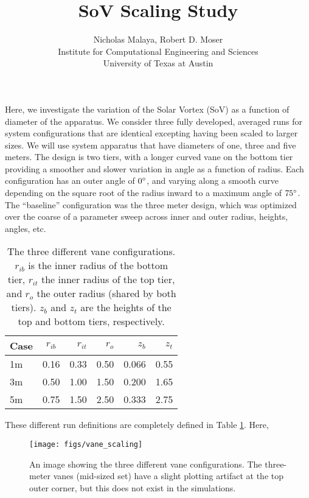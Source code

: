 \documentclass[english]{article}
\title{\bf{SoV Scaling Study}}
\author{Nicholas Malaya, Robert D. Moser \\ Institute for Computational Engineering and Sciences \\ University of Texas at Austin} \date{}
\begin{document}
\maketitle

Here, we investigate the variation of the Solar Vortex (SoV) as a function of diameter of the apparatus. We consider 
three fully developed, averaged runs for system configurations that are identical excepting having been scaled to larger sizes. We will use 
system apparatus that have diameters of one, three and five meters. The design is two tiers, with a longer curved vane on the bottom tier providing a 
smoother and slower variation in angle as a function of radius. Each configuration has an outer angle of $0\degree$, and varying along a smooth curve 
depending on the square root of the radius inward to a maximum angle of $75\degree$. The ``baseline'' configuration was the three meter design, 
which was optimized over the coarse of a parameter sweep across inner and outer radius, heights, angles, etc. 

\begin{table}
\begin{centering}
  \begin{tabular}{ | l || c | r | r | r | r |}
    \hline     
    Case & $r_{ib}$ & $r_{it}$ & $r_{o}$ & $z_{b}$ & $z_{t}$ \\ \hline \hline
    1m   & 0.16     & 0.33     & 0.50    & 0.066   & 0.55 \\ \hline
    3m   & 0.50     & 1.00     & 1.50    & 0.200   & 1.65 \\ \hline
    5m   & 0.75     & 1.50     & 2.50    & 0.333   & 2.75 \\
    \hline 
  \end{tabular}
  \caption{The three different vane configurations. $r_{ib}$ is the inner radius of the bottom tier, 
    $r_{it}$ the inner radius of the top tier, and $r_{o}$ the outer radius (shared by both tiers). 
    $z_{b}$ and $z_{t}$ are the heights of the top and bottom tiers, respectively. }\label{fig:scaling_table}
\end{centering}
\end{table}

These different run definitions are completely defined in Table \ref{fig:scaling_table}. Here, 
%
%


\begin{figure}[!htb]
  \begin{center}
    \texttt{[image: figs/vane\_scaling]}
    \caption{An image showing the three different vane configurations. The three-meter vanes (mid-sized set) 
      have a slight plotting artifact at the top outer corner, but this does not exist in the simulations. }
    \label{vane_scaling}
  \end{center}
\end{figure}
\end{document}
